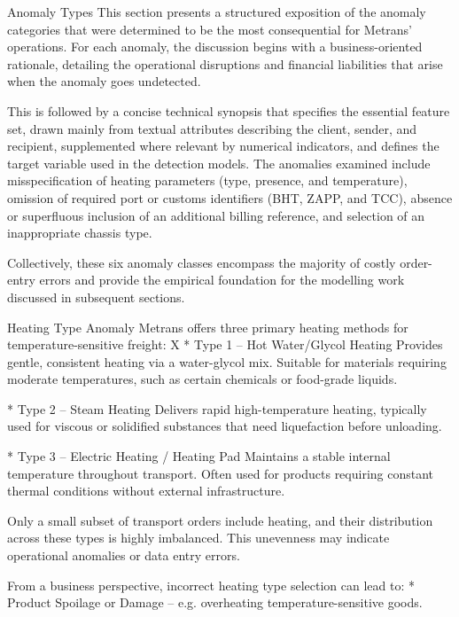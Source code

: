 \sec Anomaly Types
This section presents a structured exposition of the anomaly categories that were determined to be the most consequential for Metrans’ operations. For each anomaly, the discussion begins with a business-oriented rationale, detailing the operational disruptions and financial liabilities that arise when the anomaly goes undetected.

This is followed by a concise technical synopsis that specifies the essential feature set, drawn mainly from textual attributes describing the client, sender, and recipient, supplemented where relevant by numerical indicators, and defines the target variable used in the detection models. The anomalies examined include misspecification of heating parameters (type, presence, and temperature), omission of required port or customs identifiers (BHT, ZAPP, and TCC), absence or superfluous inclusion of an additional billing reference, and selection of an inappropriate chassis type. 

Collectively, these six anomaly classes encompass the majority of costly order-entry errors and provide the empirical foundation for the modelling work discussed in subsequent sections.

 
\secc Heating Type Anomaly
Metrans offers three primary heating methods for temperature-sensitive freight:
\begitems \style X
 * Type 1 – Hot Water/Glycol Heating
Provides gentle, consistent heating via a water-glycol mix. Suitable for materials requiring moderate temperatures, such as certain chemicals or food-grade liquids.

* Type 2 – Steam Heating
Delivers rapid high-temperature heating, typically used for viscous or solidified substances that need liquefaction before unloading.

* Type 3 – Electric Heating / Heating Pad
Maintains a stable internal temperature throughout transport. Often used for products requiring constant thermal conditions without external infrastructure.
\enditems

Only a small subset of transport orders include heating, and their distribution across these types is highly imbalanced. This unevenness may indicate operational anomalies or data entry errors.

From a business perspective, incorrect heating type selection can lead to:
\begitems
* Product Spoilage or Damage – e.g. overheating temperature-sensitive goods.

